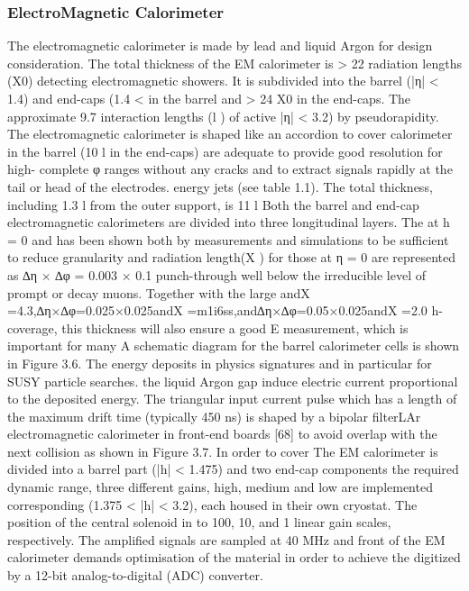 \subsubsection{ElectroMagnetic Calorimeter}
The electromagnetic calorimeter is made by lead and liquid Argon for
design consideration. The total thickness of the EM calorimeter is > 22 radiation lengths (X0)
detecting electromagnetic showers. It is subdivided into the barrel (|η| < 1.4) and end-caps (1.4 <
in the barrel and > 24 X0 in the end-caps. The approximate 9.7 interaction lengths (l ) of active
|η| < 3.2) by pseudorapidity. The electromagnetic calorimeter is shaped like an accordion to cover
calorimeter in the barrel (10 l in the end-caps) are adequate to provide good resolution for high-
complete φ ranges without any cracks and to extract signals rapidly at the tail or head of the electrodes.
energy jets (see table 1.1). The total thickness, including 1.3 l from the outer support, is 11 l
Both the barrel and end-cap electromagnetic calorimeters are divided into three longitudinal layers. The
at h = 0 and has been shown both by measurements and simulations to be sufficient to reduce granularity and radiation length(X ) for those at η = 0 are represented as ∆η × ∆φ = 0.003 × 0.1
punch-through well below the irreducible level of prompt or decay muons. Together with the large andX =4.3,∆η×∆φ=0.025×0.025andX =m1i6ss,and∆η×∆φ=0.05×0.025andX =2.0
h-coverage, this thickness will also ensure a good E measurement, which is important for many
A schematic diagram for the barrel calorimeter cells is shown in Figure 3.6. The energy deposits in physics signatures and in particular for SUSY particle searches. the liquid Argon gap induce electric current proportional to the deposited energy. The triangular input current pulse which has a length of the maximum drift time (typically 450 ns) is shaped by a bipolar filterLAr electromagnetic calorimeter
in front-end boards [68] to avoid overlap with the next collision as shown in Figure 3.7. In order to cover The EM calorimeter is divided into a barrel part (|h| < 1.475) and two end-cap components the required dynamic range, three different gains, high, medium and low are implemented corresponding (1.375 < |h| < 3.2), each housed in their own cryostat. The position of the central solenoid in to 100, 10, and 1 linear gain scales, respectively. The amplified signals are sampled at 40 MHz and front of the EM calorimeter demands optimisation of the material in order to achieve the digitized by a 12-bit analog-to-digital (ADC) converter.
